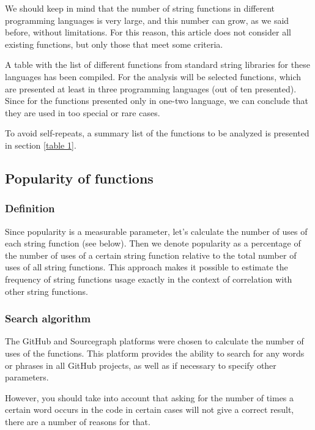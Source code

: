 \documentclass[anonymous,sigplan,review,11pt,nonacm,natbib=false]{acmart}
\begin{document}
    We should keep in mind that the number of string functions in different programming languages is very large, and this number can grow, as we said before, without limitations. For this reason, this article does not consider all existing functions, but only those that meet some criteria.

    A table with the list of different functions from standard string libraries for these languages has been compiled. For the analysis will be selected functions, which are presented at least in three programming languages (out of ten presented). Since for the functions presented only in one-two language, we can conclude that they are used in too special or rare cases.

    To avoid self-repeats, a summary list of the functions to be analyzed is presented in section \ref{table 1}.

    \subsection{Popularity of functions}

    \subsubsection{Definition}

    Since popularity is a measurable parameter, let's calculate the number of uses of each string function (see below). Then we denote popularity as a percentage of the number of uses of a certain string function relative to the total number of uses of all string functions. This approach makes it possible to estimate the frequency of string functions usage exactly in the context of correlation with other string functions.

    \subsubsection{Search algorithm}

    The GitHub and Sourcegraph platforms were chosen to calculate the number of uses of the functions. This platform provides the ability to search for any words or phrases in all GitHub projects, as well as if necessary to specify other parameters.

    However, you should take into account that asking for the number of times a certain word occurs in the code in certain cases will not give a correct result, there are a number of reasons for that.
\end{document}
